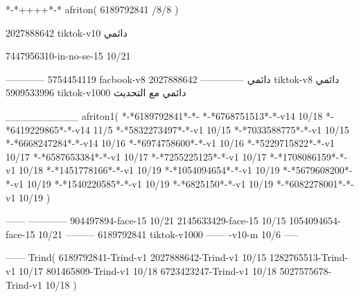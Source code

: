 *-*++++*-*
afriton(
6189792841 /8/8
)

2027888642 tiktok-v10
دائمي


7447956310-in-no-se-15 10/21

------------
5754454119 facbook-v8
دائمي
--------------
2027888642 tiktok-v8
دائمي
5909533996 tiktok-v1000
دائمي مع التحديث

__________
afriton1(
*-*6189792841*-*-
*-*6768751513*-*-v14 10/18
*-*6419229865*-*-v14 11/5
*-*5832273497*-*-v1 10/15
*-*7033588775*-*-v1 10/15
*-*6668247284*-*-v14 10/16
*-*6974758600*-*-v1 10/16
*-*5229715822*-*-v1 10/17
*-*6587653384*-*-v1 10/17
*-*7255225125*-*-v1 10/17
*-*1708086159*-*-v1 10/18
*-*1451778166*-*-v1 10/19
*-*1054094654*-*-v1 10/19
*-*5679608200*-*-v1 10/19
*-*1540220585*-*-v1 10/19
*-*6825150*-*-v1 10/19
*-*6082278001*-*-v1 10/19
)

------
------------
904497894-face-15 10/21
2145633429-face-15 10/15
1054094654-face-15 10/21
---------
6189792841 tiktok-v1000
------
-v10-m 10/6
-----

------
Trind(
6189792841-Trind-v1 
2027888642-Trind-v1 10/15
1282765513-Trind-v1 10/17
801465809-Trind-v1 10/18
6723423247-Trind-v1 10/18
5027575678-Trind-v1 10/18
)
